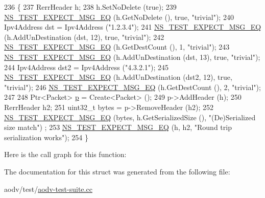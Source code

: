 \begin{DoxyCode}
236   \{
237     RerrHeader h;
238     h.SetNoDelete (\textcolor{keyword}{true});
239     \hyperlink{group__testing_ga7304ba46a28d8cf08dfdfd6499cf7068}{NS\_TEST\_EXPECT\_MSG\_EQ} (h.GetNoDelete (), \textcolor{keyword}{true}, \textcolor{stringliteral}{"trivial"});
240     Ipv4Address dst = Ipv4Address (\textcolor{stringliteral}{"1.2.3.4"});
241     \hyperlink{group__testing_ga7304ba46a28d8cf08dfdfd6499cf7068}{NS\_TEST\_EXPECT\_MSG\_EQ} (h.AddUnDestination (dst, 12), \textcolor{keyword}{true}, \textcolor{stringliteral}{"trivial"});
242     \hyperlink{group__testing_ga7304ba46a28d8cf08dfdfd6499cf7068}{NS\_TEST\_EXPECT\_MSG\_EQ} (h.GetDestCount (), 1, \textcolor{stringliteral}{"trivial"});
243     \hyperlink{group__testing_ga7304ba46a28d8cf08dfdfd6499cf7068}{NS\_TEST\_EXPECT\_MSG\_EQ} (h.AddUnDestination (dst, 13), \textcolor{keyword}{true}, \textcolor{stringliteral}{"trivial"});
244     Ipv4Address dst2 = Ipv4Address (\textcolor{stringliteral}{"4.3.2.1"});
245     \hyperlink{group__testing_ga7304ba46a28d8cf08dfdfd6499cf7068}{NS\_TEST\_EXPECT\_MSG\_EQ} (h.AddUnDestination (dst2, 12), \textcolor{keyword}{true}, \textcolor{stringliteral}{"trivial"});
246     \hyperlink{group__testing_ga7304ba46a28d8cf08dfdfd6499cf7068}{NS\_TEST\_EXPECT\_MSG\_EQ} (h.GetDestCount (), 2, \textcolor{stringliteral}{"trivial"});
247 
248     Ptr<Packet> \hyperlink{lte__link__budget_8m_ac9de518908a968428863f829398a4e62}{p} = Create<Packet> ();
249     p->AddHeader (h);
250     RerrHeader h2;
251     uint32\_t bytes = p->RemoveHeader (h2);
252     \hyperlink{group__testing_ga7304ba46a28d8cf08dfdfd6499cf7068}{NS\_TEST\_EXPECT\_MSG\_EQ} (bytes, h.GetSerializedSize (), \textcolor{stringliteral}{"(De)Serialized size match"})
      ;
253     \hyperlink{group__testing_ga7304ba46a28d8cf08dfdfd6499cf7068}{NS\_TEST\_EXPECT\_MSG\_EQ} (h, h2, \textcolor{stringliteral}{"Round trip serialization works"});
254   \}
\end{DoxyCode}


Here is the call graph for this function\+:




The documentation for this struct was generated from the following file\+:\begin{DoxyCompactItemize}
\item 
aodv/test/\hyperlink{aodv-test-suite_8cc}{aodv-\/test-\/suite.\+cc}\end{DoxyCompactItemize}
